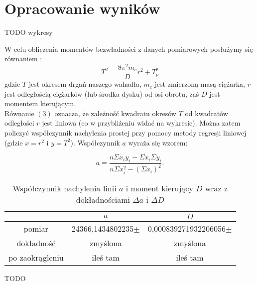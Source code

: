 \documentclass[10pt,a4paper]{article}
\newcommand{\forceindent}{\leavevmode{\parindent=3em\indent}}
\begin{document}
\section{Opracowanie wyników}
TODO wykresy

\forceindent W celu obliczenia momentów bezwładności z danych pomiarowych posłużymy się równaniem :
\begin{equation}
T^2 = \frac{8 \pi^2 m_c}{D}r^2 + T_p^2
\end{equation}
gdzie $T$ jest okresem drgań naszego wahadła, $m_c$ jest zmierzoną masą ciężarka, $r$ jest odległością ciężarków (lub środka dysku) od osi obrotu, zaś $D$ jest momentem kierującym.\\
\forceindent Równanie $(3)$ oznacza, że zależność kwadratu okresów $T$ od kwadratów odległości $r$ jest liniowa (co w przybliżeniu widać na wykresie). Można zatem policzyć współczynnik nachylenia prostej przy pomocy metody regresji liniowej (gdzie $x = r^2$ i $y = T^2$). Współczynnik $a$ wyraża się wzorem:

\begin{equation}
a=\frac{n\Sigma x_i y_i - \Sigma x_i \Sigma y_i}{n\Sigma x_i^2 - (\Sigma x_i)^2}.
\end{equation}

\begin{table}[!h]
\centering
\begin{tabular}{|cc||c|}
\multicolumn{1}{c}{} & \multicolumn{1}{c}{$a$} & \multicolumn{1}{c}{$D$}\\
\hline
pomiar & 24366,1434802235$\pm$& 0,000839271932206056$\pm$\\
\hline
dokładność & zmyślona & zmyślona\\
\hline
po zaokrągleniu & ileś tam  & ileś tam \\
\hline
\end{tabular}
\caption{Współczynnik nachylenia linii $a$ i moment kierujący $D$ wraz z dokładnościami $\Delta a$ i $\Delta D$}
\end{table}

TODO
\end{document}
